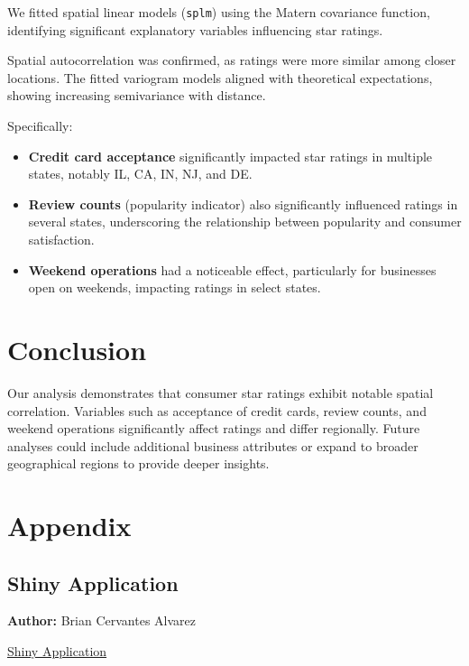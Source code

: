 \documentclass[
  12pt,
  letterpaper,
  DIV=11,
  numbers=noendperiod]{scrartcl}
\providecommand{\tightlist}{%
  \setlength{\itemsep}{0pt}\setlength{\parskip}{0pt}}\usepackage{longtable,booktabs,array}
\begin{document}
We fitted spatial linear models (\texttt{splm}) using the Matern
covariance function, identifying significant explanatory variables
influencing star ratings.

Spatial autocorrelation was confirmed, as ratings were more similar
among closer locations. The fitted variogram models aligned with
theoretical expectations, showing increasing semivariance with distance.

Specifically:

\begin{itemize}
\tightlist
\item
  \textbf{Credit card acceptance} significantly impacted star ratings in
  multiple states, notably IL, CA, IN, NJ, and DE.
\item
  \textbf{Review counts} (popularity indicator) also significantly
  influenced ratings in several states, underscoring the relationship
  between popularity and consumer satisfaction.
\item
  \textbf{Weekend operations} had a noticeable effect, particularly for
  businesses open on weekends, impacting ratings in select states.
\end{itemize}

\section{Conclusion}\label{conclusion}

Our analysis demonstrates that consumer star ratings exhibit notable
spatial correlation. Variables such as acceptance of credit cards,
review counts, and weekend operations significantly affect ratings and
differ regionally. Future analyses could include additional business
attributes or expand to broader geographical regions to provide deeper
insights.

\newpage{}

\section{Appendix}\label{appendix}

\subsection{Shiny Application}\label{shiny-application}

\textbf{Author:} Brian Cervantes Alvarez

\href{https://bcervantesalvarez.shinyapps.io/YelpReviewsDashboard/}{Shiny
Application}
\end{document}
